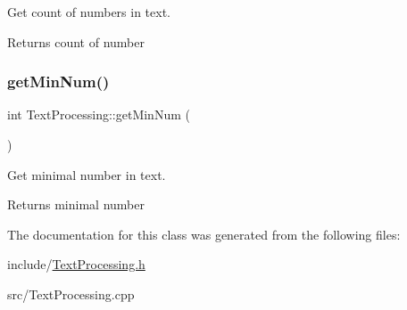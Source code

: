 Get count of numbers in text. 

\begin{DoxyReturn}{Returns}
count of number 
\end{DoxyReturn}
\mbox{\label{class_text_processing_a725bc350ff62e442e2c1116402bcf180}} 
\subsubsection{\texorpdfstring{get\+Min\+Num()}{getMinNum()}}
{\footnotesize\ttfamily int Text\+Processing\+::get\+Min\+Num (\begin{DoxyParamCaption}{ }\end{DoxyParamCaption})}



Get minimal number in text. 

\begin{DoxyReturn}{Returns}
minimal number 
\end{DoxyReturn}


The documentation for this class was generated from the following files\+:\begin{DoxyCompactItemize}
\item 
include/\hyperlink{_text_processing_8h}{Text\+Processing.\+h}\item 
src/Text\+Processing.\+cpp\end{DoxyCompactItemize}
